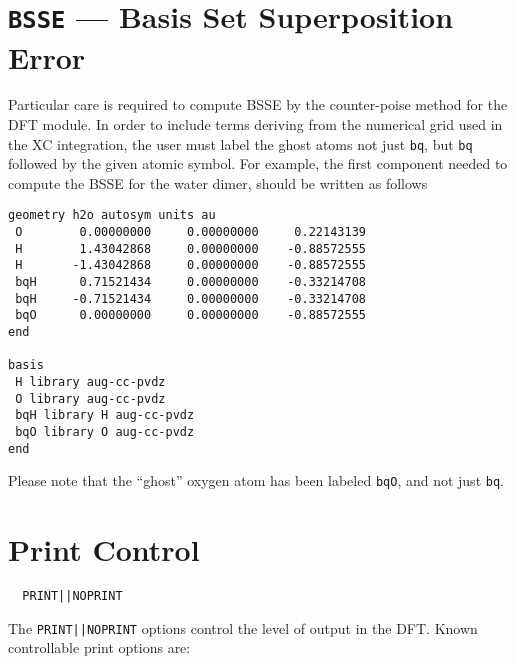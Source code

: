 \section{{\tt BSSE} --- Basis Set Superposition Error}

Particular care is required to compute BSSE by the counter-poise
method for the DFT module. In order to include terms deriving from
the numerical grid used in the XC integration, the user must label
the ghost atoms not just {\tt bq}, but {\tt bq} followed by the given
atomic symbol. For example, the first component needed to compute the
BSSE for the water dimer, should be written as follows

\begin{verbatim}
geometry h2o autosym units au
 O        0.00000000     0.00000000     0.22143139
 H        1.43042868     0.00000000    -0.88572555
 H       -1.43042868     0.00000000    -0.88572555
 bqH      0.71521434     0.00000000    -0.33214708
 bqH     -0.71521434     0.00000000    -0.33214708
 bqO      0.00000000     0.00000000    -0.88572555
end

basis
 H library aug-cc-pvdz
 O library aug-cc-pvdz
 bqH library H aug-cc-pvdz
 bqO library O aug-cc-pvdz
end
\end{verbatim}

Please note that the ``ghost'' oxygen atom has been labeled {\tt bqO},
and not just {\tt bq}.
\section{Print Control}
\begin{verbatim}
  PRINT||NOPRINT
\end{verbatim}

The \verb+PRINT||NOPRINT+ options control the level of output in the
DFT.  Known controllable print options are:


